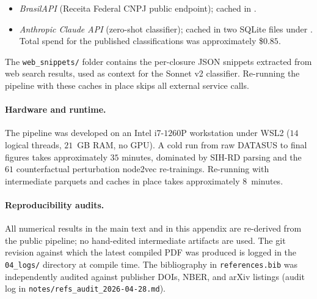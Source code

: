 \begin{itemize}
    \item \emph{BrasilAPI} (Receita Federal CNPJ public endpoint);
    cached in .
    \item \emph{Anthropic Claude API} (zero-shot classifier); cached in
    two SQLite files under . Total spend for
    the published classifications was approximately \$$0.85$.
\end{itemize}

The \texttt{web\_snippets/} folder contains the per-closure JSON
snippets extracted from web search results, used as context for the
Sonnet v2 classifier. Re-running the pipeline with these caches in
place skips all external service calls.

\paragraph{Hardware and runtime.} The pipeline was developed on an
Intel i7-$1260$P workstation under WSL2 ($14$ logical threads, $21$~GB
RAM, no GPU). A cold run from raw DATASUS to final figures takes
approximately $35$ minutes, dominated by SIH-RD parsing and the $61$
counterfactual perturbation node2vec re-trainings. Re-running with
intermediate parquets and caches in place takes approximately
$8$~minutes.

\paragraph{Reproducibility audits.} All numerical results in the main
text and in this appendix are re-derived from the public pipeline; no
hand-edited intermediate artifacts are used. The git revision against
which the latest compiled PDF was produced is logged in the
\texttt{04\_logs/} directory at compile time. The bibliography in
\texttt{references.bib} was independently audited against publisher
DOIs, NBER, and arXiv listings (audit log in
\texttt{notes/refs\_audit\_2026-04-28.md}).
